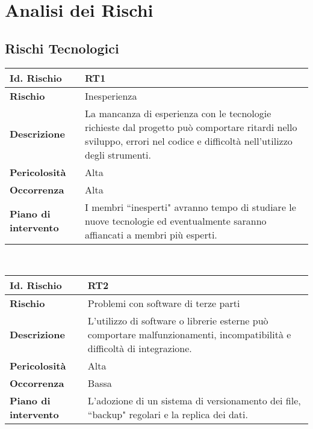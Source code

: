 \section{Analisi dei Rischi}

\subsection{Rischi Tecnologici}

\hypertarget{RT1}{}
\begin{tabular}{|L{4cm}|L{9.7cm}|}
    \hline
    \textbf{Id. Rischio} & \textbf{RT1} \\
    \hline
    \textbf{Rischio} & Inesperienza \\
    \hline
    \textbf{Descrizione} & La mancanza di esperienza con le tecnologie richieste dal progetto può comportare ritardi nello sviluppo, errori nel codice e difficoltà nell'utilizzo degli strumenti. \\
    \hline
    \textbf{Pericolosità} & Alta \\
    \hline
    \textbf{Occorrenza} & Alta \\
    \hline
    \textbf{Piano di intervento} & I membri ``inesperti" avranno tempo di studiare le nuove tecnologie ed eventualmente saranno affiancati a membri più esperti. \\
    \hline
\end{tabular}
\\[30pt]
\hypertarget{RT2}{}
\begin{tabular}{|L{4cm}|L{9.7cm}|}
    \hline
    \textbf{Id. Rischio} & \textbf{RT2} \\
    \hline
    \textbf{Rischio} & Problemi con software di terze parti \\
    \hline
    \textbf{Descrizione} & L'utilizzo di software o librerie esterne può comportare malfunzionamenti, incompatibilità e difficoltà di integrazione. \\
    \hline
    \textbf{Pericolosità} & Alta \\
    \hline
    \textbf{Occorrenza} & Bassa \\
    \hline
    \textbf{Piano di intervento} & L'adozione di un sistema di versionamento dei file, ``backup" regolari e la replica dei dati. \\
    \hline
\end{tabular}
\\[30pt]
\hypertarget{RT3}{}
